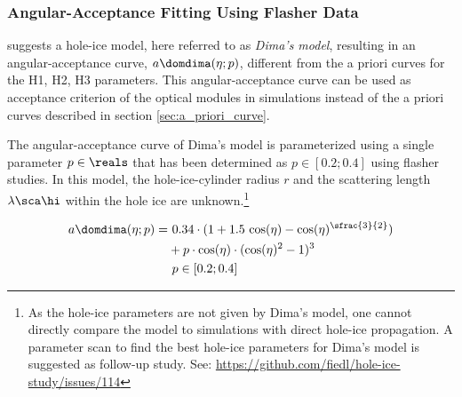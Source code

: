 \subsubsection{Angular-Acceptance Fitting Using Flasher Data}
\label{sec:dimas_model}

%
%
%
%
%
\chirkin \cite{flasherdataderivedicemodels} suggests a hole-ice model, here referred to as \textit{Dima's model}, resulting in an angular-acceptance curve, $a\domdima(\eta;p)$, different from the a priori curves for the H1, H2, H3 parameters.
This angular-acceptance curve can be used as acceptance criterion of the optical modules in simulations instead of the a priori curves described in section \ref{sec:a_priori_curve}.

The angular-acceptance curve of Dima's model is parameterized using a single parameter $p\in\reals$ that has been determined as $p \in [0.2;0.4]$ using flasher studies. \cite{msuforwardholeice} In this model, the hole-ice-cylinder radius $r$ and the scattering length $\lambda\sca\hi$ within the hole ice are unknown.\footnote{As the hole-ice parameters are not given by Dima's model, one cannot directly compare the model to \clsim simulations with direct hole-ice propagation. A parameter scan to find the best hole-ice parameters for Dima's model is suggested as follow-up study. See: \url{https://github.com/fiedl/hole-ice-study/issues/114} \followup}

\begin{align}
  a\domdima(\eta;p) = & \ 0.34 \cdot (1 + 1.5\,\cos(\eta) - \cos(\eta)^{\sfrac{3}{2}}) \nonumber \\
      & + p \cdot \cos(\eta) \cdot  (\cos(\eta)^2 - 1)^3 \\
      & \ p \in [0.2;0.4] \nonumber
  \label{eq:adima}
\end{align}

